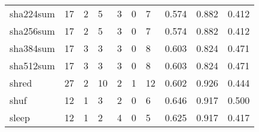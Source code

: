 \begin{longtable}{lp{2.0cm}p{2.0cm}p{2.0cm}p{2.0cm}p{2.0cm}p{2.0cm}p{2.0cm}p{2.0cm}p{2.0cm}}
sha224sum &                     17 &                                             2 &                                            5 &                                           3 &                                            0 &                                          7 &                                0.574 &                                  0.882 &                                0.412 \\
sha256sum &                     17 &                                             2 &                                            5 &                                           3 &                                            0 &                                          7 &                                0.574 &                                  0.882 &                                0.412 \\
sha384sum &                     17 &                                             3 &                                            3 &                                           3 &                                            0 &                                          8 &                                0.603 &                                  0.824 &                                0.471 \\
sha512sum &                     17 &                                             3 &                                            3 &                                           3 &                                            0 &                                          8 &                                0.603 &                                  0.824 &                                0.471 \\
shred     &                     27 &                                             2 &                                           10 &                                           2 &                                            1 &                                         12 &                                0.602 &                                  0.926 &                                0.444 \\
shuf      &                     12 &                                             1 &                                            3 &                                           2 &                                            0 &                                          6 &                                0.646 &                                  0.917 &                                0.500 \\
sleep     &                     12 &                                             1 &                                            2 &                                           4 &                                            0 &                                          5 &                                0.625 &                                  0.917 &                                0.417 \\

\end{longtable}
